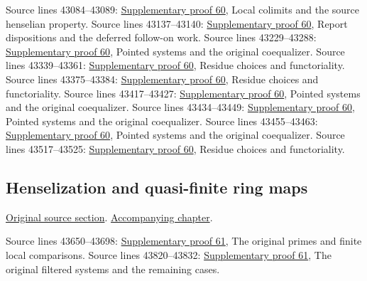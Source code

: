 \begin{AlgebraSourceRoutes}
 Source lines 43084--43089: \hyperlink{algebra_henselization_notes_20260929}{Supplementary proof 60}, Local colimits and the source henselian property.
 Source lines 43137--43140: \hyperlink{algebra_henselization_notes_20260929}{Supplementary proof 60}, Report dispositions and the deferred follow-on work.
 Source lines 43229--43288: \hyperlink{algebra_henselization_notes_20260929}{Supplementary proof 60}, Pointed systems and the original coequalizer.
 Source lines 43339--43361: \hyperlink{algebra_henselization_notes_20260929}{Supplementary proof 60}, Residue choices and functoriality.
 Source lines 43375--43384: \hyperlink{algebra_henselization_notes_20260929}{Supplementary proof 60}, Residue choices and functoriality.
 Source lines 43417--43427: \hyperlink{algebra_henselization_notes_20260929}{Supplementary proof 60}, Pointed systems and the original coequalizer.
 Source lines 43434--43449: \hyperlink{algebra_henselization_notes_20260929}{Supplementary proof 60}, Pointed systems and the original coequalizer.
 Source lines 43455--43463: \hyperlink{algebra_henselization_notes_20260929}{Supplementary proof 60}, Pointed systems and the original coequalizer.
 Source lines 43517--43525: \hyperlink{algebra_henselization_notes_20260929}{Supplementary proof 60}, Residue choices and functoriality.
\end{AlgebraSourceRoutes}

\subsection{Henselization and quasi-finite ring maps}
\hypertarget{algebra-source-section-henselization-quasi-finite}{}
\noindent\href{https://github.com/stacks/stacks-project/blob/a04446e57ec1fbc252a871afcec7752fb2807b14/algebra.tex\#L43573}{Original source section}. \href{algebra.pdf\#nameddest=section-henselization-quasi-finite}{Accompanying chapter}.

\begin{AlgebraSourceRoutes}
 Source lines 43650--43698: \hyperlink{algebra_quasifinite_henselization_notes_20260929}{Supplementary proof 61}, The original primes and finite local comparisons.
 Source lines 43820--43832: \hyperlink{algebra_quasifinite_henselization_notes_20260929}{Supplementary proof 61}, The original filtered systems and the remaining cases.
\end{AlgebraSourceRoutes}

